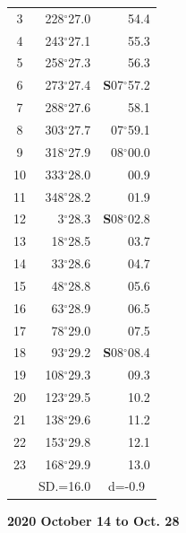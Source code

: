 \documentclass[10pt, a4paper]{report}
\begin{document}
\begin{scriptsize}
\begin{tabular*}{0.2\textwidth}[t]{@{\extracolsep{\fill}}|c|rr|}
3 & 228$^\circ$27.0 & \raisebox{0.24ex}{\boldmath$\cdot$~\boldmath$\cdot$~~}54.4\\
4 & 243$^\circ$27.1 & 55.3\\
5 & 258$^\circ$27.3 & 56.3\\[2Pt]
6 & 273$^\circ$27.4 & \textbf{S}07$^\circ$57.2\\
7 & 288$^\circ$27.6 & 58.1\\
8 & 303$^\circ$27.7 & 07$^\circ$59.1\\
9 & 318$^\circ$27.9 & 08$^\circ$00.0\\
10 & 333$^\circ$28.0 & 00.9\\
11 & 348$^\circ$28.2 & 01.9\\[2Pt]
12 & 3$^\circ$28.3 & \textbf{S}08$^\circ$02.8\\
13 & 18$^\circ$28.5 & 03.7\\
14 & 33$^\circ$28.6 & 04.7\\
15 & 48$^\circ$28.8 & \raisebox{0.24ex}{\boldmath$\cdot$~\boldmath$\cdot$~~}05.6\\
16 & 63$^\circ$28.9 & 06.5\\
17 & 78$^\circ$29.0 & 07.5\\[2Pt]
18 & 93$^\circ$29.2 & \textbf{S}08$^\circ$08.4\\
19 & 108$^\circ$29.3 & 09.3\\
20 & 123$^\circ$29.5 & 10.2\\
21 & 138$^\circ$29.6 & \raisebox{0.24ex}{\boldmath$\cdot$~\boldmath$\cdot$~~}11.2\\
22 & 153$^\circ$29.8 & 12.1\\
23 & 168$^\circ$29.9 & 13.0\\
\hline
\rule{0pt}{2.4ex} & \multicolumn{1}{c}{SD.=16.0} & \multicolumn{1}{c|}{d=-0.9}\\
\hline
\end{tabular*}

\end{scriptsize}
\newpage
\sffamily
\noindent
\begin{flushright}
\textbf{2020 October 14 to Oct. 28}\par
\end{flushright}
\end{document}

